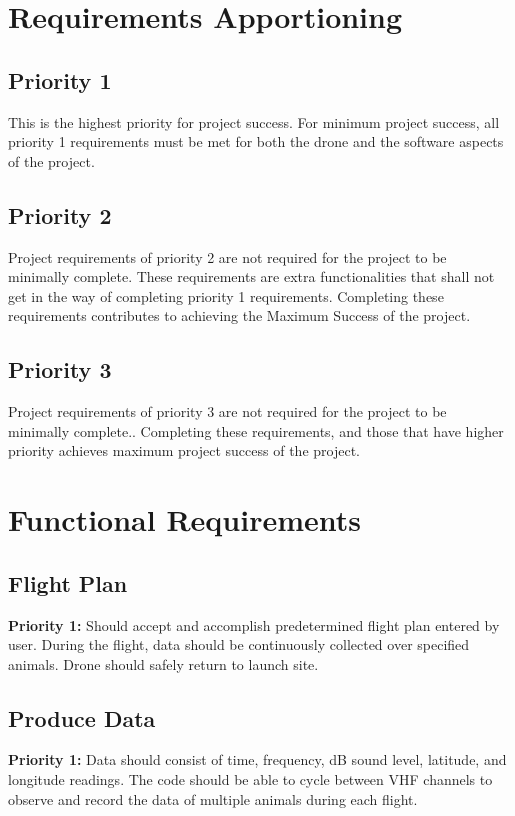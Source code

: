 \documentclass[onecolumn, draftclsnofoot,10pt, compsoc]{IEEEtran}
\begin{document}
\section{Requirements Apportioning}
\subsection{Priority 1}
This is the highest priority for project success. For minimum project success, all priority 1 requirements must be met for both the drone and the software aspects of the project.

\subsection{Priority 2}
Project requirements of priority 2 are not required for the project to be minimally complete. These requirements are extra functionalities that shall not get in the way of completing priority 1 requirements. Completing these requirements contributes to achieving the Maximum Success of the project.

\subsection{Priority 3}
Project requirements of priority 3 are not required for the project to be minimally complete.. Completing these requirements, and those that have higher priority achieves maximum project success of the project.

\section{Functional Requirements}
\subsection{Flight Plan}
\textbf{Priority 1:} Should accept and accomplish predetermined flight plan entered by user. During the flight, data should be continuously collected over specified animals. Drone should safely return to launch site.

\subsection{Produce Data}
\textbf{Priority 1:} Data should consist of time, frequency, dB sound level, latitude, and longitude readings. The code should be able to cycle between VHF channels to observe and record the data of multiple animals during each flight.
\end{document}

